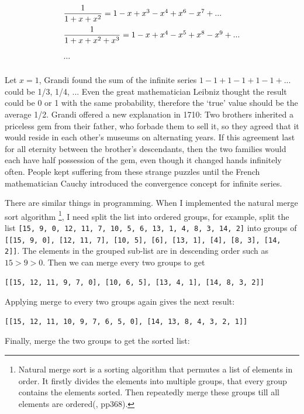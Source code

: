 \documentclass{article}
\begin{document}
\[
\def\arraystretch{2.2}
\begin{array}{l}
\dfrac{1}{1 + x + x^2} = 1 - x + x^3 - x^4 + x^6 - x^7 + ... \\%
\dfrac{1}{1 + x + x^2 + x^3} = 1 - x + x^4 - x^5 + x^8 - x^9 + ... \\
...
\end{array}
\]

Let $x = 1$, Grandi found the sum of the infinite series $1 - 1 + 1 - 1 + 1 - 1 + ...$ could be 1/3, 1/4, ... Even the great mathematician Leibniz thought the result could be 0 or 1 with the same probability, therefore the `true' value should be the average 1/2. Grandi offered a new explanation in 1710: Two brothers inherited a priceless gem from their father, who forbade them to sell it, so they agreed that it would reside in each other's museums on alternating years. If this agreement last for all eternity between the brother's descendants, then the two families would each have half possession of the gem, even though it changed hands infinitely often\cite{HanXueTao16}. People kept suffering from these strange puzzles until the French mathematician Cauchy introduced the convergence concept for infinite series.

There are similar things in programming. When I implemented the natural merge sort algorithm \footnote{Natural merge sort is a sorting algorithm that permutes a list of elements in order. It firstly divides the elements into multiple groups, that every group contains the elements sorted. Then repeatedly merge these groups till all elements are ordered(\cite{LiuXinyu2017}, pp368).}, I need split the list into ordered groups, for example, split the list \texttt{[15, 9, 0, 12, 11, 7, 10, 5, 6, 13, 1, 4, 8, 3, 14, 2]} into groups of \texttt{[[15, 9, 0], [12, 11, 7], [10, 5], [6], [13, 1], [4], [8, 3], [14, 2]]}. The elements in the grouped sub-list are in descending order such as $15 > 9 > 0$. Then we can merge every two groups to get

\begin{verbatim}
[[15, 12, 11, 9, 7, 0], [10, 6, 5], [13, 4, 1], [14, 8, 3, 2]]
\end{verbatim}

Applying merge to every two groups again gives the next result:

\begin{verbatim}
[[15, 12, 11, 10, 9, 7, 6, 5, 0], [14, 13, 8, 4, 3, 2, 1]]
\end{verbatim}

Finally, merge the two groups to get the sorted list:
\end{document}
